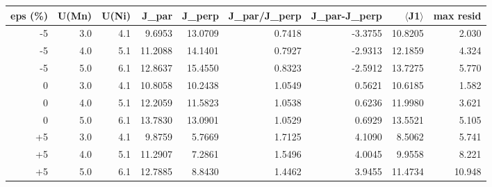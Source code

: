 \begin{tabular}{rrrrrrrrr}
\hline
eps (\%) & U(Mn) & U(Ni) & J\_par & J\_perp & J\_par/J\_perp & J\_par-J\_perp & $\langle$J1$\rangle$ & max resid \\
\hline
-5 & 3.0 & 4.1 & 9.6953 & 13.0709 & 0.7418 & -3.3755 & 10.8205 & 2.030 \\
-5 & 4.0 & 5.1 & 11.2088 & 14.1401 & 0.7927 & -2.9313 & 12.1859 & 4.324 \\
-5 & 5.0 & 6.1 & 12.8637 & 15.4550 & 0.8323 & -2.5912 & 13.7275 & 5.770 \\
0 & 3.0 & 4.1 & 10.8058 & 10.2438 & 1.0549 & 0.5621 & 10.6185 & 1.582 \\
0 & 4.0 & 5.1 & 12.2059 & 11.5823 & 1.0538 & 0.6236 & 11.9980 & 3.621 \\
0 & 5.0 & 6.1 & 13.7830 & 13.0901 & 1.0529 & 0.6929 & 13.5521 & 5.105 \\
+5 & 3.0 & 4.1 & 9.8759 & 5.7669 & 1.7125 & 4.1090 & 8.5062 & 5.741 \\
+5 & 4.0 & 5.1 & 11.2907 & 7.2861 & 1.5496 & 4.0045 & 9.9558 & 8.221 \\
+5 & 5.0 & 6.1 & 12.7885 & 8.8430 & 1.4462 & 3.9455 & 11.4734 & 10.948 \\
\hline
\end{tabular}
